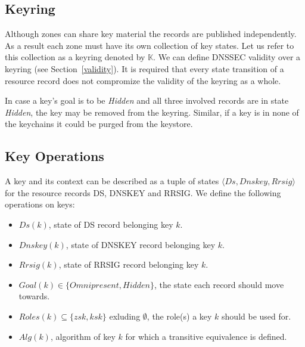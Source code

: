 \documentclass[twoside,english, a4paper]{article}
\begin{document}
\subsection{Keyring}

Although zones can share key material the records are published 
independently. As a result each zone must have its own collection of
key states. Let us refer to this collection as a keyring denoted 
by $\mathbb{K}$. We can
define DNSSEC validity over a keyring (see Section~\ref{validity}).
It is required that every state transition of a resource record does 
not compromize the validity of the keyring as a whole.

In case a key's goal is to be \emph{Hidden} and all three involved
records are in state \emph{Hidden}, the key may be removed from the
keyring. Similar, if a key is in none of the keychains it could be
purged from the keystore.

\subsection{Key Operations}

A key and its context can be described as a tuple of states $\langle 
Ds,Dnskey,Rrsig\rangle$ for the resource records DS, DNSKEY and RRSIG.
We define the following operations on keys:

\begin{itemize}
	\item $Ds(k)$, state of DS record belonging key $k$.
	\item $Dnskey(k)$, state of DNSKEY record belonging key $k$.
	\item $Rrsig(k)$, state of RRSIG record belonging key $k$.
	\item $Goal(k) \in \{Omnipresent, Hidden\}$, the state each record
		should move towards.
	\item $Roles(k) \subseteq \{zsk,ksk\}$ exluding $\emptyset$, the 
		role(s) a key $k$ should be used for.
	\item $Alg(k)$, algorithm of key $k$ for which a transitive equivalence
		is defined.
\end{itemize}
\end{document}

